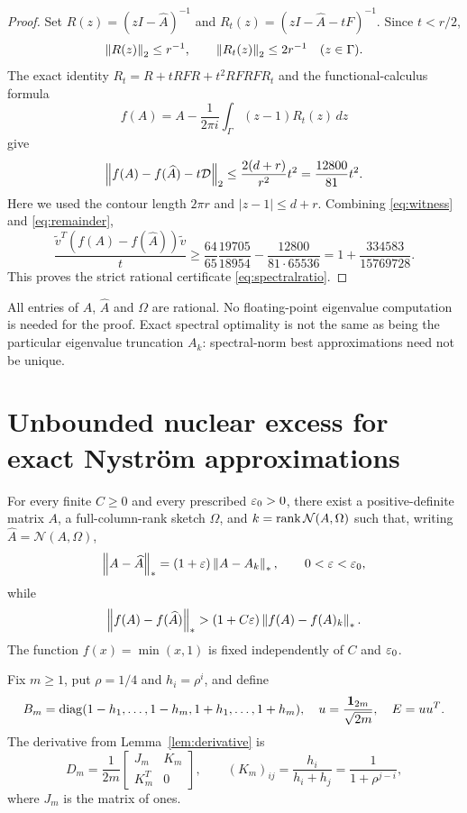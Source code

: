 \documentclass[11pt]{article}
\begin{document}
\begin{proof}
Set $R(z)=(zI-\widehat A)^{-1}$ and $R_t(z)=(zI-\widehat A-tF)^{-1}$. Since $t<r/2$,
\[
 \left\lVert R(z)\right\rVert_2\le r^{-1},\qquad
 \left\lVert R_t(z)\right\rVert_2\le2r^{-1}\quad(z\in\Gamma).
\]
The exact identity $R_t=R+tRFR+t^2RFRFR_t$ and the functional-calculus formula
\[
 f(A)=A-\frac1{2\pi i}\int_\Gamma(z-1)R_t(z)\,dz
\]
give
\begin{equation}\label{eq:remainder}
 \left\lVert f(A)-f(\widehat A)-t\mathcal D\right\rVert_2
 \le\frac{2(d+r)}{r^2}t^2=\frac{12800}{81}t^2.
\end{equation}
Here we used the contour length $2\pi r$ and $|z-1|\le d+r$. Combining \eqref{eq:witness} and \eqref{eq:remainder},
\[
 \frac{\widetilde v^T(f(A)-f(\widehat A))\widetilde v}{t}
 \ge\frac{64}{65}\frac{19705}{18954}
       -\frac{12800}{81\cdot65536}
 =1+\frac{334583}{15769728}.
\]
This proves the strict rational certificate \eqref{eq:spectralratio}.
\end{proof}

All entries of $A$, $\widehat A$ and $\Omega$ are rational. No floating-point eigenvalue computation is needed for the proof. Exact spectral optimality is not the same as being the particular eigenvalue truncation $A_k$: spectral-norm best approximations need not be unique.

\section{Unbounded nuclear excess for exact Nystr\"om approximations}
\begin{theorem}\label{thm:nuclear}
For every finite $C\ge0$ and every prescribed $\varepsilon_0>0$, there exist a positive-definite matrix $A$, a full-column-rank sketch $\Omega$, and $k=\operatorname{rank}\mathcal N(A,\Omega)$ such that, writing $\widehat A=\mathcal N(A,\Omega)$,
\[
 \left\lVert A-\widehat A\right\rVert_*=(1+\varepsilon)\left\lVert A-A_k\right\rVert_*,
 \qquad 0<\varepsilon<\varepsilon_0,
\]
while
\[
 \left\lVert f(A)-f(\widehat A)\right\rVert_*>(1+C\varepsilon)\left\lVert f(A)-f(A)_k\right\rVert_*.
\]
The function $f(x)=\min(x,1)$ is fixed independently of $C$ and $\varepsilon_0$.
\end{theorem}

Fix $m\ge1$, put $\rho=1/4$ and $h_i=\rho^i$, and define
\[
 B_m=\operatorname{diag}(1-h_1,\ldots,1-h_m,1+h_1,\ldots,1+h_m),
 \quad u=\frac{\boldsymbol1_{2m}}{\sqrt{2m}},\quad E=uu^T.
\]
The derivative from Lemma~\ref{lem:derivative} is
\begin{equation}\label{eq:Dm}
 D_m=\frac1{2m}\begin{bmatrix}J_m&K_m\\K_m^T&0\end{bmatrix},
 \qquad (K_m)_{ij}=\frac{h_i}{h_i+h_j}
                  =\frac1{1+\rho^{j-i}},
\end{equation}
where $J_m$ is the matrix of ones.
\end{document}
